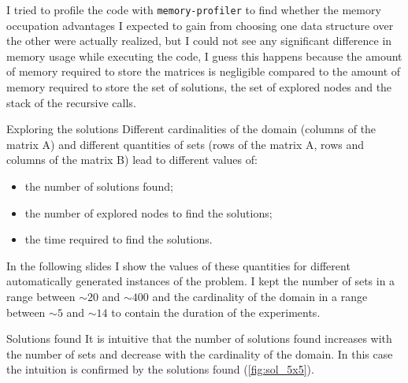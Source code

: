 \documentclass{beamer}
\begin{document}
\begin{frame}
    I tried to profile the code with \texttt{memory-profiler} 
    to find whether the memory occupation
    advantages
    I expected to gain from choosing one data structure over the other
    were actually realized, but I could not see any significant difference
    in memory usage while executing the code, I guess this happens because
    the amount of memory required to store the matrices is negligible compared
    to the amount of memory required to store the set of solutions, the set of explored nodes
    and the stack of the recursive calls.
\end{frame}


\begin{frame}{Exploring the solutions}
    Different cardinalities of the domain (columns of the matrix A) and
    different quantities of sets (rows of the matrix A, rows and columns of the matrix B) 
    lead to different values of:
    \begin{itemize}
        \item the number of solutions found;
        \item the number of explored nodes to find the solutions;
        \item the time required to find the solutions.
    \end{itemize}
    In the following slides I show the values of these quantities for different
    automatically generated instances of the problem. I kept the 
    number of sets in a range between $\sim20$ and $\sim400$ and the cardinality of the domain
    in a range between $\sim5$ and $\sim14$ to contain the duration of the experiments.
\end{frame}

\begin{frame}{Solutions found}
    It is intuitive that the number of solutions found increases
    with the number of sets and decrease with the cardinality of the domain.
    In this case the intuition is confirmed by the solutions found (\ref{fig:sol_5x5}).
\end{frame}
\end{document}
